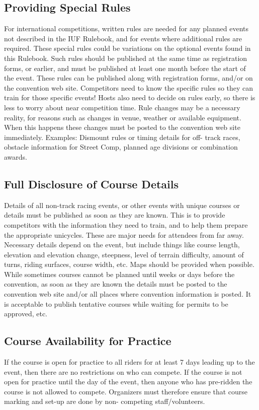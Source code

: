 \subsection{Providing Special Rules}
For international competitions, written rules are needed for any planned events not described in the IUF Rulebook, and for events where additional rules are required. 
These special rules could be variations on the optional events found in this Rulebook. 
Such rules should be published at the same time as registration forms, or earlier, and must be published at least one month before the start of the event. 
These rules can be published along with registration forms, and/or on the convention web site. 
Competitors need to know the specific rules so they can train for those specific events! 
Hosts also need to decide on rules early, so there is less to worry about near competition time. 
Rule changes may be a necessary reality, for reasons such as changes in venue, weather or available equipment. 
When this happens these changes must be posted to the convention web site immediately. 
Examples: Dismount rules or timing details for off- track races, obstacle information for Street Comp, planned age divisions or combination awards.

\subsection{Full Disclosure of Course Details}
Details of all non-track racing events, or other events with unique courses or details must be published as soon as they are known. 
This is to provide competitors with the information they need to train, and to help them prepare the appropriate unicycles. These are major needs for attendees from far away. 
Necessary details depend on the event, but include things like course length, elevation and elevation change, steepness, level of terrain difficulty, amount of turns, riding surfaces, course width, etc. Maps should be provided when possible. 
While sometimes courses cannot be planned until weeks or days before the convention, as soon as they are known the details must be posted to the convention web site and/or all places where convention information is posted. 
It is acceptable to publish tentative courses while waiting for permits to be approved, etc.

\subsection{Course Availability for Practice}
If the course is open for practice to all riders for at least 7 days leading up to the event, then there are no restrictions on who can compete. 
If the course is not open for practice until the day of the event, then anyone who has pre-ridden the course is not allowed to compete. 
Organizers must therefore ensure that course marking and set-up are done by non- competing staff/volunteers.

